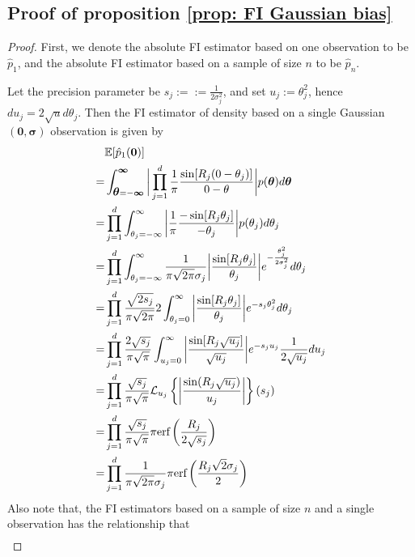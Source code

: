 \documentclass[%
 reprint,
 amsmath,amssymb,
 aps,
]{revtex4-2}
\def\E{\mathbb{E}}
\def\erf{\text{erf}}
\newcommand{\btheta}{\mbox{\boldmath $\theta$}}
\begin{document}
\subsection{Proof of proposition \ref{prop: FI Gaussian bias}}
\begin{proof}
    First, we denote the absolute FI estimator based on one observation to be $\hat{p}_{\text{1}}$, and the absolute FI estimator based on a sample of size $n$ to be $\hat{p}_{n}$.

    Let the precision parameter be $s_j := := \frac{1}{2\sigma_j^2}$, and set $u_j := \theta_j^2$, hence $du_j = 2\sqrt{u}d\theta_j$. Then the FI estimator of density based on a single Gaussian$(\mathbf{0},
    \boldsymbol{\sigma})$ observation is given by
    \begin{align*}
        & \E[\hat{p}_{\text{1}}(\mathbf{0})] \\
        = & \int_{\btheta = -\boldsymbol{\infty}}^{\boldsymbol{\infty}}\bigg|\prod_{j = 1}^d \frac{1}{\pi} \frac{\sin[R_j(0 - \theta_j)]}{0 - \theta}\bigg| p(\btheta)d\btheta \\
        = & \prod_{j = 1}^d \int_{\theta_j = -\infty}^\infty\bigg|\frac{1}{\pi} \frac{-\sin[R_j\theta_j]}{ - \theta_j}\bigg| p(\theta_j) d\theta_j \\
        = & \prod_{j = 1}^d \int_{\theta_j = -\infty}^\infty\frac{1}{\pi\sqrt{2\pi}\sigma_j}\bigg| \frac{\sin[R_j\theta_j]}{\theta_j}\bigg| e^{-\frac{\theta_j^2}{2\sigma_j^2}} d\theta_j \\
        = & \prod_{j = 1}^d \frac{\sqrt{2s_j}}{\pi\sqrt{2\pi}}2\int_{\theta_j = 0}^\infty \bigg| \frac{\sin[R_j\theta_j]}{\theta_j}\bigg| e^{-s_j\theta_j^2} d\theta_j \\
        = & \prod_{j = 1}^d \frac{2\sqrt{s_j}}{\pi\sqrt{\pi}}\int_{u_j = 0}^\infty \bigg| \frac{\sin[R_j\sqrt{u_j}]}{\sqrt{u_j}}\bigg| e^{-s_ju_j} \frac{1}{2\sqrt{u_j}}du_j \\
        = & \prod_{j = 1}^d \frac{\sqrt{s_j}}{\pi\sqrt{\pi}} \mathcal{L}_{u_j}\left\{\bigg|\frac{\sin(R_j\sqrt{u_j})}{u_j} \bigg| \right\}(s_j) \\
        = & \prod_{j = 1}^d \frac{\sqrt{s_j}}{\pi\sqrt{\pi}} \pi \erf\left(\frac{R_j}{2\sqrt{s_j}} \right) \\
        = & \prod_{j = 1}^d \frac{1}{\pi\sqrt{2\pi}\sigma_j} \pi \erf\left(\frac{R_j\sqrt{2}\sigma_j}{2} \right)
    \end{align*}
    Also note that, the FI estimators based on a sample of size $n$ and a single observation has the relationship that
    \begin{align*}

\end{align*}
\end{proof}
\end{document}
